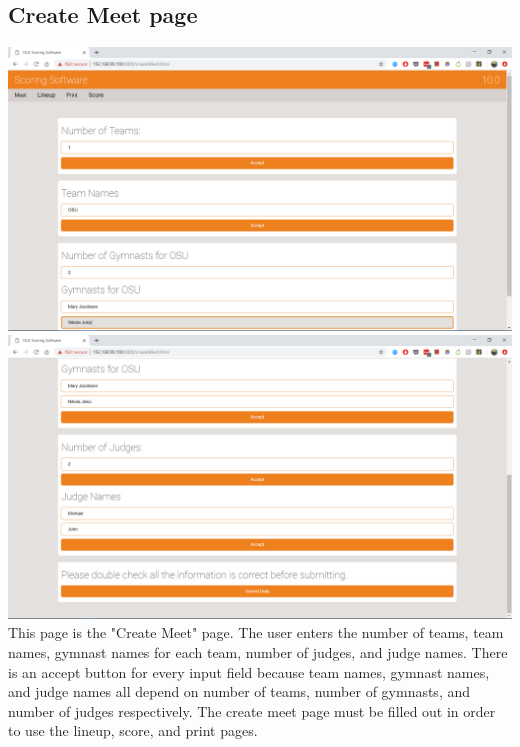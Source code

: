 \documentclass[letterpaper,10pt,draftclsnofoot,onecolumn,]{article}
\begin{document}
\subsection{Create Meet page}
\includegraphics[width=\textwidth]{Capture.PNG}
\includegraphics[width=\textwidth]{Capture2.PNG}
This page is the "Create Meet" page. The user enters the number of teams, team names, gymnast names for each team, number of judges, and judge names. There is an accept button for every input field because team names, gymnast names, and judge names all depend on number of teams, number of gymnasts, and number of judges respectively. The create meet page must be filled out in order to use the lineup, score, and print pages. 
\end{document}
